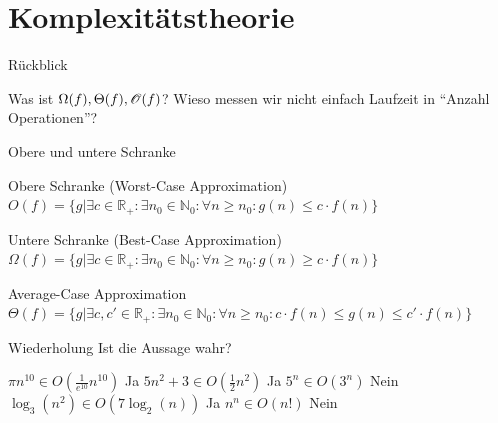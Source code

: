 \documentclass{beamer}
\begin{document}

\begin{frame}
	\titlepage
\end{frame}

\section{Komplexitätstheorie}
\begin{frame}{Rückblick}
	\begin{itemize}
		\pitem Was ist $\Omega(f), \Theta(f), \mathscr{O}(f)$?
		\pitem Wieso messen wir nicht einfach Laufzeit in ``Anzahl Operationen''?
	\end{itemize}
\end{frame}

\begin{frame}{Obere und untere Schranke}
	\begin{block}{Obere Schranke (Worst-Case Approximation)}
		$O(f) = \{g| \exists c \in \mathbb{R}_+ : \exists n_0 \in \mathbb{N}_0: \forall n \geq n_0 : g(n)\leq c \cdot f(n)\}$
	\end{block}
	
	\pause
	
	\begin{block}{Untere Schranke (Best-Case Approximation)}
		$\Omega(f) = \{g| \exists c \in \mathbb{R}_+ : \exists n_0 \in \mathbb{N}_0: \forall n \geq n_0 : g(n)\geq c \cdot f(n)\}$
	\end{block}

	\pause

	\begin{block}{Average-Case Approximation}
		$\Theta(f) = \{g|\exists c, c' \in \mathbb{R}_+ : \exists n_0 \in \mathbb{N}_0: \forall n \geq n_0 : c \cdot f(n) \leq g(n)\leq c' \cdot f(n)\}$
	\end{block}

	\pause
	
\end{frame}

\begin{frame}{Wiederholung}
Ist die Aussage wahr?
\begin{itemize}
\pitem $\pi n^{10} \in O(\frac{1}{e^{10}} n^{10})$ \pause Ja
\pitem $5n^2+3 \in O(\frac{1}{2}n^2)$ \pause Ja
\pitem $5^n \in O(3^n)$ \pause Nein
\pitem $\log_3(n^2) \in O(7\log_2(n))$ \pause Ja
\pitem $n^n \in O(n!)$ \pause Nein

\end{itemize}

\end{frame}
\end{document}

